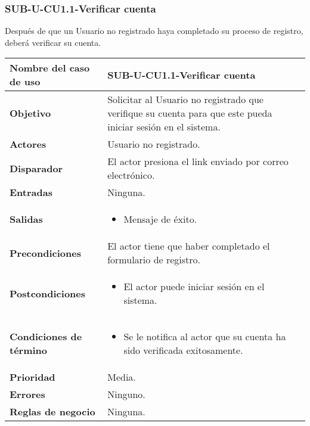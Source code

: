 \subsubsection{SUB-U-CU1.1-Verificar cuenta}\label{SUB-U-CU1.1}
Después de que un Usuario no registrado haya completado su proceso de registro, deberá verificar su cuenta.

\begin{longtable}{|J{5cm}|J{10.3cm}|}
	\hline
	\textbf{Nombre del caso de uso} &
		SUB-U-CU1.1-Verificar cuenta \\ \hline
	\textbf{Objetivo} &
		Solicitar al Usuario no registrado que verifique su cuenta para que este pueda iniciar sesión en el sistema. \\ \hline
	\textbf{Actores} &
		Usuario no registrado. \\ \hline 
	\textbf{Disparador} & 
		El actor presiona el link enviado por correo electrónico. \\ \hline 
	\textbf{Entradas} & Ninguna.
		\\ \hline 
	\textbf{Salidas} & 
		\begin{itemize}
			\item Mensaje de éxito.
		\end{itemize} \\ \hline
	\textbf{Precondiciones} &
		El actor tiene que haber completado el formulario de registro.\\ \hline
	\textbf{Postcondiciones} &
		\begin{itemize}
			\item El actor puede iniciar sesión en el sistema.
		\end{itemize} \\ \hline
	\textbf{Condiciones de término} & 
		\begin{itemize}
			\item Se le notifica al actor que su cuenta ha sido verificada exitosamente.
		\end{itemize} \\ \hline 
	\textbf{Prioridad} & 
		Media. \\ \hline
	\textbf{Errores} & Ninguno.
		\\ \hline
	\textbf{Reglas de negocio} & Ninguna.
		 \\ \hline
\end{longtable}

